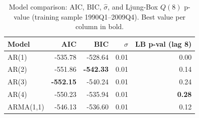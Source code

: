 \begin{table}[H]
  \centering
  \caption{Model comparison: AIC, BIC, $\hat{\sigma}$, and Ljung-Box $Q(8)$ p-value (training sample 1990Q1--2009Q4). Best value per column in bold.}
  \label{tab:model_selection}
  \begin{tabular}{lrrrr}
  \toprule
  Model & AIC & BIC & $\hat{\sigma}$ & LB p-val (lag 8) \\
  \midrule
  AR(1) & -535.78 & -528.64 & 0.01 & 0.00 \\
  AR(2) & -551.86 & \textbf{-542.33} & 0.01 & 0.14 \\
  AR(3) & \textbf{-552.15} & -540.24 & 0.01 & 0.24 \\
  AR(4) & -550.23 & -535.94 & 0.01 & \textbf{0.28} \\
  ARMA(1,1) & -546.13 & -536.60 & 0.01 & 0.12 \\
  \bottomrule
  \end{tabular}
\end{table}
